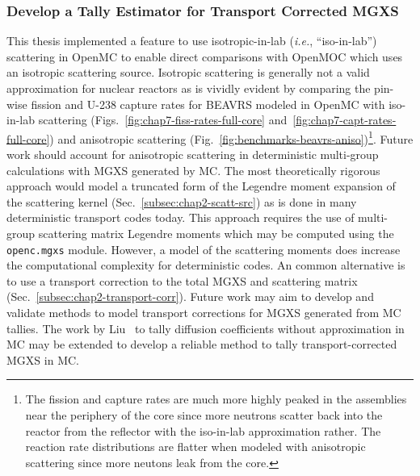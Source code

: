 \subsubsection{Develop a Tally Estimator for Transport Corrected MGXS}
\label{subsubsec:chap12-transport-mgxs}

This thesis implemented a feature to use isotropic-in-lab (\textit{i.e.}, ``iso-in-lab'') scattering in OpenMC to enable direct comparisons with OpenMOC which uses an isotropic scattering source. Isotropic scattering is generally not a valid approximation for nuclear reactors as is vividly evident by comparing the pin-wise fission and U-238 capture rates for \ac{BEAVRS} modeled in OpenMC with iso-in-lab scattering (Figs.~\ref{fig:chap7-fiss-rates-full-core} and~\ref{fig:chap7-capt-rates-full-core}) and anisotropic scattering (Fig.~\ref{fig:benchmarks-beavrs-aniso})\footnote{The fission and capture rates are much more highly peaked in the assemblies near the periphery of the core since more neutrons scatter back into the reactor from the reflector with the iso-in-lab approximation rather. The reaction rate distributions are flatter when modeled with anisotropic scattering since more neutons leak from the core.}. Future work should account for anisotropic scattering in deterministic multi-group calculations with \ac{MGXS} generated by \ac{MC}. The most theoretically rigorous approach would model a truncated form of the Legendre moment expansion of the scattering kernel (Sec.~\ref{subsec:chap2-scatt-src}) as is done in many deterministic transport codes today. This approach requires the use of multi-group scattering matrix Legendre moments which may be computed using the \texttt{openc.mgxs} module. However, a model of the scattering moments does increase the computational complexity for deterministic codes. An common alternative is to use a transport correction to the total \ac{MGXS} and scattering matrix (Sec.~\ref{subsec:chap2-transport-corr}). Future work may aim to develop and validate methods to model transport corrections for \ac{MGXS} generated from \ac{MC} tallies. The work by Liu~\cite{liuphysor2016} to tally diffusion coefficients without approximation in \ac{MC} may be extended to develop a reliable method to tally transport-corrected \ac{MGXS} in \ac{MC}.


